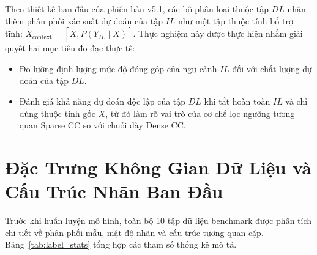 \documentclass[11pt,a4paper]{article}
\begin{document}
Theo thiết kế ban đầu của phiên bản v5.1, các bộ phân loại thuộc tập $DL$ nhận thêm phân phối xác suất dự đoán của tập $IL$ như một tập thuộc tính bổ trợ tĩnh: $X_{\text{context}} = [X, \hat{P}(Y_{IL} \mid X)]$. Thực nghiệm này được thực hiện nhằm giải quyết hai mục tiêu đo đạc thực tế:
\begin{itemize}[leftmargin=*]
  \item Đo lường định lượng mức độ đóng góp của ngữ cảnh $IL$ đối với chất lượng dự đoán của tập $DL$.
  \item Đánh giá khả năng dự đoán độc lập của tập $DL$ khi tắt hoàn toàn $IL$ và chỉ dùng thuộc tính gốc $X$, từ đó làm rõ vai trò của cơ chế lọc ngưỡng tương quan Sparse CC so với chuỗi dày Dense CC.
\end{itemize}

\section{Đặc Trưng Không Gian Dữ Liệu và Cấu Trúc Nhãn Ban Đầu}
Trước khi huấn luyện mô hình, toàn bộ 10 tập dữ liệu benchmark được phân tích chi tiết về phân phối mẫu, mật độ nhãn và cấu trúc tương quan cặp. Bảng~\ref{tab:label_stats} tổng hợp các tham số thống kê mô tả.
\end{document}
